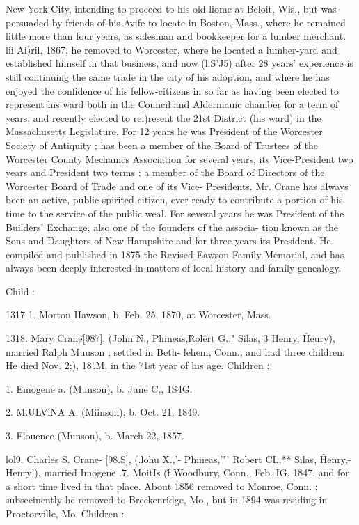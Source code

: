 \documentclass{book}
\begin{document}
New York City, intending to proceed to his old liome at Beloit, 
Wis., but was persuaded by friends of his Avife to locate in 
Boston, Mass., where he remained little more than four years, as 
salesman and bookkeeper for a lumber merchant. lii Ai)ril, 
1867, he removed to Worcester, where he located a lumber-yard 
and established himself in that business, and now (l.S'J5) after 
28 years' experience is still continuing the same trade in the city 
of his adoption, and where he has enjoyed the confidence of his 
fellow-citizens in so far as having been elected to represent his 
ward both in the Council and Aldermauic chamber for a term of 
years, and recently elected to rei)resent the 21st District (his 
ward) in the Massachusetts Legislature. For 12 years he was 
President of the Worcester Society of Antiquity ; has been a 
member of the Board of Trustees of the Worcester County 
Mechanics Association for several years, its Vice-President two 
years and President two terms ; a member of the Board of 
Directors of the Worcester Board of Trade and one of its Vice- 
Presidents. Mr. Crane has always been an active, public-spirited 
citizen, ever ready to contribute a portion of his time to the 
service of the public weal. For several years he was President 
of the Builders' Exchange, also one of the founders of the associa- 
tion known as the Sons and Daughters of New Hampshire and 
for three years its President. He compiled and published in 
1875 the Revised Eawson Family Memorial, and has always been 
deeply interested in matters of local history and family genealogy. 

Child : 

1317  1. Morton IIawson, b, Feb. 25, 1870, at Worcester, Mass. 

1318. Mary Crane\^ [987], (John N., Phineas,\^ Rol\^ert G.," 
Silas, 3 Henry, \^ Heury\^), married Ralph Muuson ; settled in Beth- 
lehem, Conn., and had three children. He died Nov. 2;), 18'.M, 
in the 71st year of his age. Children : 

1. Emogene a. (Munson), b. June C,, 1S4G. 

2. M.ULViNA A. (Miinson), b. Oct. 21, 1849. 

3. Flouence (Munson), b. March 22, 1857. 

lol9. Charles S. Crane- [98.S], (.lohu X.,'- Phiiieas,'"' 
Robert CI.,** Silas, \^ Henry,- Henry'), married Imogene .7. MoitIs 
(\^f Woodbury, Conn., Feb. IG, 1847, and for a short time lived in 
that place. About 1856 removed to Monroe, Conn. ; subsecinently 
he removed to Breckenridge, Mo., but in 1894 was residing in 
Proctorville, Mo. Children : 
\end{document}
